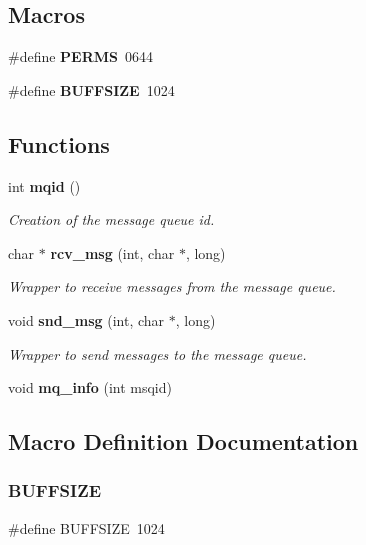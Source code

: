 \subsection*{Macros}
\begin{DoxyCompactItemize}
\item 
\#define \textbf{ P\+E\+R\+MS}~0644
\item 
\#define \textbf{ B\+U\+F\+F\+S\+I\+ZE}~1024
\end{DoxyCompactItemize}
\subsection*{Functions}
\begin{DoxyCompactItemize}
\item 
int \textbf{ mqid} ()
\begin{DoxyCompactList}\small\item\em Creation of the message queue id. \end{DoxyCompactList}\item 
char $\ast$ \textbf{ rcv\+\_\+msg} (int, char $\ast$, long)
\begin{DoxyCompactList}\small\item\em Wrapper to receive messages from the message queue. \end{DoxyCompactList}\item 
void \textbf{ snd\+\_\+msg} (int, char $\ast$, long)
\begin{DoxyCompactList}\small\item\em Wrapper to send messages to the message queue. \end{DoxyCompactList}\item 
void \textbf{ mq\+\_\+info} (int msqid)
\end{DoxyCompactItemize}


\subsection{Macro Definition Documentation}
\mbox{\label{mq_8h_a39912bfe2a55f30e269196f9141d845d}} 
\subsubsection{B\+U\+F\+F\+S\+I\+ZE}
{\footnotesize\ttfamily \#define B\+U\+F\+F\+S\+I\+ZE~1024}

\mbox{\label{mq_8h_afee0dce2271f56a18b4656548b2de8cc}} 
